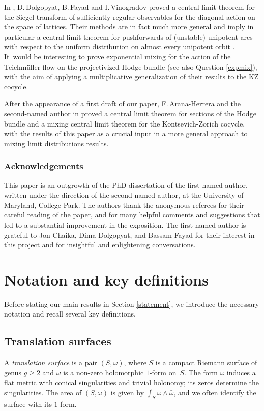 \documentclass[10pt]{amsart}
\theoremstyle{plain}
\theoremstyle{definition}
\numberwithin{equation}{subsection}
\begin{document}
In \cite{DFV17}, D.\,Dolgopyat, B.\,Fayad and I.\,Vinogradov proved a central limit theorem for the Siegel transform of sufficiently regular observables for the diagonal action on the space of
lattices. Their methods are in fact much more general and imply in particular a central limit theorem for pushforwards of (unstable) unipotent arcs with respect to the uniform distribution on almost every unipotent orbit \cite[Th.\,7.1, Cor.\,7.2]{DFV17}. It~would be interesting to prove exponential mixing for the action of the Teichmüller flow on the projectivized Hodge bundle (see also Question \ref{expmix}), with the aim of applying a multiplicative generalization of their results to the KZ cocycle.

After the appearance of a first
draft of our paper, F.\,Arana-Herrera and the second-named author in \cite{AF24} proved a central limit theorem for sections of the Hodge bundle and a mixing central limit theorem for the Kontsevich-Zorich cocycle, with the results of this paper as a crucial input in a more general approach to
mixing limit distributions results.

\subsubsection*{Acknowledgements} This paper is an outgrowth of the PhD dissertation of the first-named author, written under the direction of the second-named author, at the University of Maryland, College Park. The authors thank the anonymous referees for their careful reading of the paper, and for many helpful comments and suggestions that led to a substantial improvement in the exposition. The first-named author is grateful to Jon Chaika, Dima Dolgopyat, and Bassam Fayad for their interest in this project and for insightful and enlightening conversations.\enlargethispage{.7\baselineskip}

\section{Notation and key definitions}

Before stating our main results in Section \ref{statement}, we introduce the necessary notation and recall several key definitions.

\subsection{Translation surfaces} A \emph{translation surface} is a pair $(S, \omega)$, where $S$ is a compact Riemann surface of genus $g \geq 2$ and $\omega$ is a non-zero holomorphic $1$-form on~$S$. The form $\omega$ induces a flat metric with conical singularities and trivial holonomy; its zeros determine the singularities. The area of $(S,\omega)$ is given by $\int_S \omega \wedge \bar{\omega}$, and we often identify the surface with its $1$-form.
\end{document}

